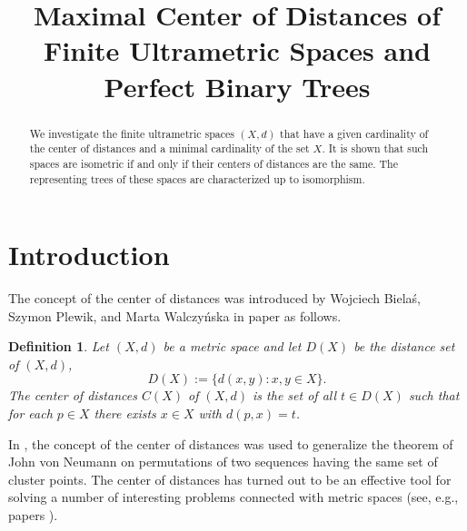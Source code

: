\documentclass{raex}
\newtheorem{defn}[thm]{Definition}
\theoremstyle{definition}
\theoremstyle{remark}
\numberwithin{equation}{section}
\begin{document}
\large
{}


\title{Maximal Center of Distances of Finite Ultrametric Spaces and Perfect Binary Trees}




\maketitle

 \begin{abstract} 
We investigate the finite ultrametric spaces $(X,d)$ that have a given cardinality of the center of distances and a minimal cardinality of the set $X$. It is shown that such spaces are isometric if and only if their centers of distances are the same.
The representing trees of these spaces are characterized up to isomorphism.
\end{abstract}











\section{Introduction}


The concept of the center of distances was introduced by Wojciech Bielaś, Szymon Plewik, and Marta Walczyńska in  paper \cite{BPW2018} as follows.
\begin{defn}\label{zcgh572}
Let $(X,d)$ be a metric space and let $D(X)$ be the distance set of $(X,d)$,
\begin{equation*}
D(X) := \{ d(x,y) : x,y \in X \}.
\end{equation*}
The {\it center of distances} $C(X)$  of $(X,d)$ is the set of all $t\in D(X)$ such that for each $p\in X$  there exists $x\in X$ with $d(p,x)=t$.
\end{defn}

In \cite{BPW2018}, the concept of the center of distances was used to generalize the theorem of John von Neumann on permutations of two sequences having the same set of cluster points.
The center of distances has turned out to be an effective tool for solving a number of interesting problems connected with metric spaces (see, e.g., papers
\cite{Bartoszewicz2018,Banakiewicz2022,Banakiewicz2023,Kula2025,NowakowskiPrusWisniowski2026,Bartoszewicz2024}).
\end{document}
